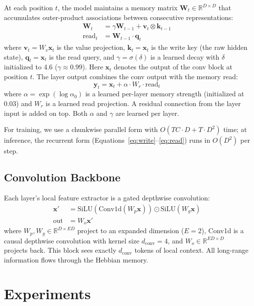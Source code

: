 \documentclass{article}
\newcommand{\vk}{\mathbf{k}}
\newcommand{\vv}{\mathbf{v}}
\newcommand{\vq}{\mathbf{q}}
\newcommand{\vx}{\mathbf{x}}
\newcommand{\vy}{\mathbf{y}}
\newcommand{\mW}{\mathbf{W}}
\begin{document}
At each position $t$, the model maintains a memory matrix $\mW_t \in \mathbb{R}^{D \times D}$ that accumulates outer-product associations between consecutive representations:
\begin{align}
    \mW_t &= \gamma \mW_{t-1} + \vv_t \otimes \vk_{t-1} \label{eq:write} \\
    \text{read}_t &= \mW_{t-1} \cdot \vq_t \label{eq:read}
\end{align}
where $\vv_t = W_v \vx_t$ is the value projection, $\vk_t = \vx_t$ is the write key (the raw hidden state), $\vq_t = \vx_t$ is the read query, and $\gamma = \sigma(\delta)$ is a learned decay with $\delta$ initialized to 4.6 ($\gamma \approx 0.99$). Here $\vx_t$ denotes the output of the conv block at position $t$. The layer output combines the conv output with the memory read:
\begin{equation}
    \vy_t = \vx_t + \alpha \cdot W_r \cdot \text{read}_t
\end{equation}
where $\alpha = \exp(\log \alpha_0)$ is a learned per-layer memory strength (initialized at 0.03) and $W_r$ is a learned read projection. A residual connection from the layer input is added on top. Both $\alpha$ and $\gamma$ are learned per layer.

For training, we use a chunkwise parallel form with $O(TC \cdot D + T \cdot D^2)$ time; at inference, the recurrent form (Equations~\ref{eq:write}--\ref{eq:read}) runs in $O(D^2)$ per step.

\subsection{Convolution Backbone}

Each layer's local feature extractor is a gated depthwise convolution:
\begin{align}
    \vx' &= \text{SiLU}(\text{Conv1d}(W_p \vx)) \odot \text{SiLU}(W_g \vx) \\
    \text{out} &= W_o \vx'
\end{align}
where $W_p, W_g \in \mathbb{R}^{D \times ED}$ project to an expanded dimension ($E{=}2$), Conv1d is a causal depthwise convolution with kernel size $d_\text{conv}{=}4$, and $W_o \in \mathbb{R}^{ED \times D}$ projects back. This block sees exactly $d_\text{conv}$ tokens of local context. All long-range information flows through the Hebbian memory.


\section{Experiments}
\end{document}
